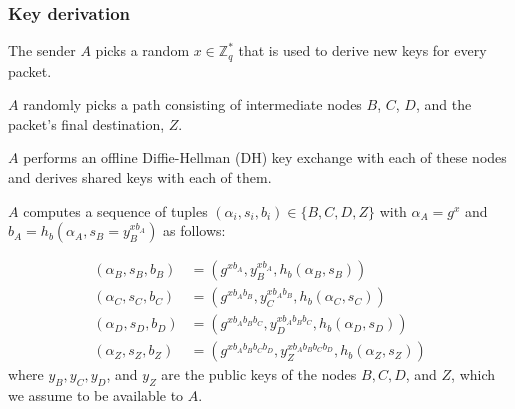 \subsubsection{Key derivation}
\label{sec:sphinx:keyderivation}

The sender $A$ picks a random $x\in \mathbb{Z}^*_q$ that is used to derive new keys for every packet.

$A$ randomly picks a path consisting of intermediate nodes $B$, $C$, $D$, and the packet's final destination, $Z$.

$A$ performs an offline Diffie-Hellman (DH) key exchange with each of these nodes and derives shared keys with each of them.

$A$ computes a sequence of tuples $(\alpha_i,s_i,b_i) \in \{ B, C, D, Z \}$ with $\alpha_A = g^x$ and $b_A = h_b(\alpha_A, s_B = y_B^{x b_A})$ as follows:

\begin{align*}
    (\alpha_B,s_B,b_B) & = (g^{x b_A},y_B^{x b_A},h_b(\alpha_B,s_B))                         \\
    (\alpha_C,s_C,b_C) & = (g^{x b_A b_B},y_C^{x b_A b_B},h_b(\alpha_C,s_C))                 \\
    (\alpha_D,s_D,b_D) & = (g^{x b_A b_B b_C},y_D^{x b_A b_B b_C},h_b(\alpha_D,s_D))         \\
    (\alpha_Z,s_Z,b_Z) & = (g^{x b_A b_B b_C b_D},y_Z^{x b_A b_B b_C b_D},h_b(\alpha_Z,s_Z))
\end{align*}
where $y_B, y_C, y_D$, and $y_Z$ are the public keys of the nodes $B, C, D$, and $Z$, which we assume to be available to $A$.

